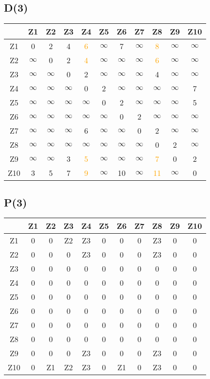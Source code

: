 \documentclass[a4paper,11pt]{article}
\begin{document}
\subsection*{D(3)}
\begin{center}
\begin{tabular}{c|cccccccccc}
 & Z1 & Z2 & Z3 & Z4 & Z5 & Z6 & Z7 & Z8 & Z9 & Z10 \\ \hline
Z1 & 0 & 2 & 4 & \textcolor{orange}{6} & $\infty$ & 7 & $\infty$ & \textcolor{orange}{8} & $\infty$ & $\infty$ \\
Z2 & $\infty$ & 0 & 2 & \textcolor{orange}{4} & $\infty$ & $\infty$ & $\infty$ & \textcolor{orange}{6} & $\infty$ & $\infty$ \\
Z3 & $\infty$ & $\infty$ & 0 & 2 & $\infty$ & $\infty$ & $\infty$ & 4 & $\infty$ & $\infty$ \\
Z4 & $\infty$ & $\infty$ & $\infty$ & 0 & 2 & $\infty$ & $\infty$ & $\infty$ & $\infty$ & 7 \\
Z5 & $\infty$ & $\infty$ & $\infty$ & $\infty$ & 0 & 2 & $\infty$ & $\infty$ & $\infty$ & 5 \\
Z6 & $\infty$ & $\infty$ & $\infty$ & $\infty$ & $\infty$ & 0 & 2 & $\infty$ & $\infty$ & $\infty$ \\
Z7 & $\infty$ & $\infty$ & $\infty$ & 6 & $\infty$ & $\infty$ & 0 & 2 & $\infty$ & $\infty$ \\
Z8 & $\infty$ & $\infty$ & $\infty$ & $\infty$ & $\infty$ & $\infty$ & $\infty$ & 0 & 2 & $\infty$ \\
Z9 & $\infty$ & $\infty$ & 3 & \textcolor{orange}{5} & $\infty$ & $\infty$ & $\infty$ & \textcolor{orange}{7} & 0 & 2 \\
Z10 & 3 & 5 & 7 & \textcolor{orange}{9} & $\infty$ & 10 & $\infty$ & \textcolor{orange}{11} & $\infty$ & 0 \\
\end{tabular}
\end{center}
\subsection*{P(3)}
\begin{center}
\begin{tabular}{c|cccccccccc}
 & Z1 & Z2 & Z3 & Z4 & Z5 & Z6 & Z7 & Z8 & Z9 & Z10 \\ \hline
Z1 & 0 & 0 & Z2 & Z3 & 0 & 0 & 0 & Z3 & 0 & 0 \\
Z2 & 0 & 0 & 0 & Z3 & 0 & 0 & 0 & Z3 & 0 & 0 \\
Z3 & 0 & 0 & 0 & 0 & 0 & 0 & 0 & 0 & 0 & 0 \\
Z4 & 0 & 0 & 0 & 0 & 0 & 0 & 0 & 0 & 0 & 0 \\
Z5 & 0 & 0 & 0 & 0 & 0 & 0 & 0 & 0 & 0 & 0 \\
Z6 & 0 & 0 & 0 & 0 & 0 & 0 & 0 & 0 & 0 & 0 \\
Z7 & 0 & 0 & 0 & 0 & 0 & 0 & 0 & 0 & 0 & 0 \\
Z8 & 0 & 0 & 0 & 0 & 0 & 0 & 0 & 0 & 0 & 0 \\
Z9 & 0 & 0 & 0 & Z3 & 0 & 0 & 0 & Z3 & 0 & 0 \\
Z10 & 0 & Z1 & Z2 & Z3 & 0 & Z1 & 0 & Z3 & 0 & 0 \\
\end{tabular}
\end{center}
\newpage
\end{document}
